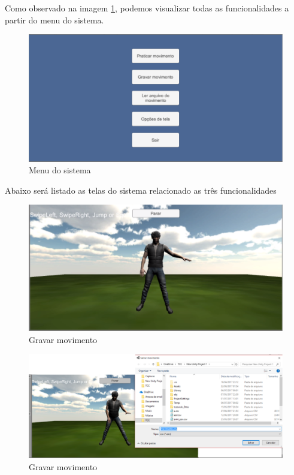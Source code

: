    Como observado na imagem \ref{img:menu}, podemos visualizar todas as funcionalidades a partir do menu do sistema.

   \begin{figure}[H]
   \centering
   \includegraphics [keepaspectratio=true,scale=0.40]{figuras/menu.eps}
   \caption{Menu do sistema}
   \label{img:menu}
   \end{figure}

     Abaixo será listado as telas do sistema relacionado as três funcionalidades

     \begin{figure}[H]
     \centering
     \includegraphics [keepaspectratio=true,scale=0.40]{figuras/gravarmovimento.eps}
     \caption{Gravar movimento}
     \label{img:gravarmovimento}
     \end{figure}

     \begin{figure}[H]
     \centering
     \includegraphics [keepaspectratio=true,scale=0.40]{figuras/gravarmovimento2.eps}
     \caption{Gravar movimento}
     \label{img2:gravarmovimento}
     \end{figure}

